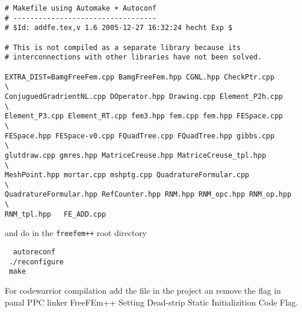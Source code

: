 \begin{verbatim}
# Makefile using Automake + Autoconf
# ----------------------------------
# $Id: addfe.tex,v 1.6 2005-12-27 16:32:24 hecht Exp $

# This is not compiled as a separate library because its
# interconnections with other libraries have not been solved.

EXTRA_DIST=BamgFreeFem.cpp BamgFreeFem.hpp CGNL.hpp CheckPtr.cpp        \
ConjuguedGradrientNL.cpp DOperator.hpp Drawing.cpp Element_P2h.cpp      \
Element_P3.cpp Element_RT.cpp fem3.hpp fem.cpp fem.hpp FESpace.cpp      \
FESpace.hpp FESpace-v0.cpp FQuadTree.cpp FQuadTree.hpp gibbs.cpp        \
glutdraw.cpp gmres.hpp MatriceCreuse.hpp MatriceCreuse_tpl.hpp          \
MeshPoint.hpp mortar.cpp mshptg.cpp QuadratureFormular.cpp              \
QuadratureFormular.hpp RefCounter.hpp RNM.hpp RNM_opc.hpp RNM_op.hpp    \
RNM_tpl.hpp   FE_ADD.cpp

\end{verbatim}

and do in the \texttt{freefem++} root directory
\begin{verbatim}
  autoreconf
 ./reconfigure
 make
\end{verbatim}
 



For codewarrior compilation add the file in the project an remove the flag
in panal  PPC linker FreeFEm++ Setting Dead-strip Static Initializition Code Flag.
